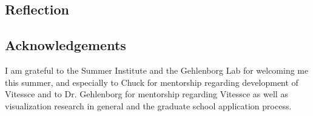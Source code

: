 \documentclass[12pt, letterpaper]{article}
\begin{document}
\subsection{Reflection}


\subsection*{Acknowledgements}
I am grateful to the Summer Institute and the Gehlenborg Lab for welcoming me this summer, and especially to Chuck for mentorship regarding development of Vitessce and to Dr. Gehlenborg for mentorship regarding Vitessce as well as visualization research in general and the graduate school application process.


{}

\end{document}
